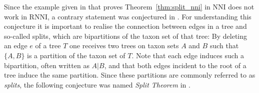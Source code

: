 \documentclass{amsart}
\newcommand{\nni}{\mathrm{NNI}}
\newcommand{\rnni}{\mathrm{RNNI}}
\begin{document}



Since the example given in \autocite{Li1996-zw} that proves Theorem~\ref{thm:split_nni} in $\nni$ does not work in $\rnni$, a contrary statement was conjectured in \autocite{Gavryushkin2018-ol}.
For understanding this conjecture it is important to realise the connection between edges in a tree and so-called splits, which are bipartitions of the taxon set of that tree:
By deleting an edge $e$ of a tree $T$ one receives two trees on taxon sets $A$ and $B$ such that $\{A,B\}$ is a partition of the taxon set of $T$.
Note that each edge induces such a bipartition, often written as $A|B$, and that both edges incident to the root of a tree induce the same partition.
Since these partitions are commonly referred to as \emph{splits}, the following conjecture was named \emph{Split Theorem} in \autocite{Gavryushkin2018-ol}.
\end{document}
